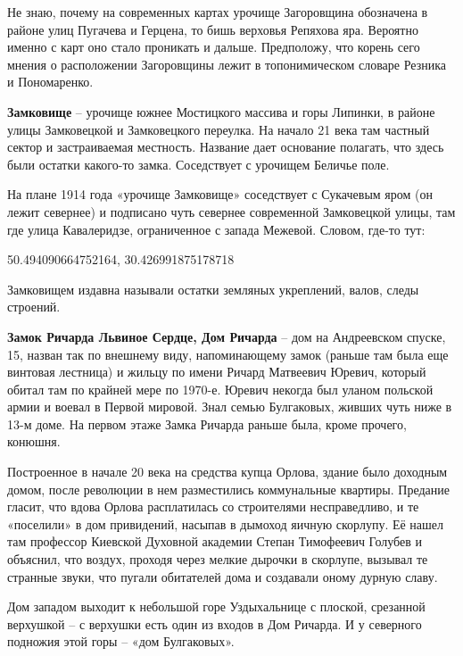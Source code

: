 Не знаю, почему на современных картах урочище Загоровщина обозначена в районе улиц Пугачева и Герцена, то бишь верховья Репяхова яра. Вероятно именно с карт оно стало проникать и дальше. Предположу, что корень сего мнения о расположении Загоровщины лежит в топонимическом словаре Резника и Пономаренко.\\

\medskip

\textbf{Замковище} – урочище южнее Мостицкого массива и горы Липинки, в районе улицы Замковецкой и Замковецкого переулка. На начало 21 века там частный сектор и застраиваемая местность. Название дает основание полагать, что здесь были остатки какого-то замка. Соседствует с урочищем Беличье поле.

На плане 1914 года «урочище Замковище» соседствует с Сукачевым яром (он лежит севернее) и подписано чуть севернее современной Замковецкой улицы, там где улица Кавалеридзе, ограниченное с запада Межевой. Словом, где-то тут:

50.494090664752164, 30.426991875178718

Замковищем издавна называли остатки земляных укреплений, валов, следы строений.\\ 

\medskip

\textbf{Замок Ричарда Львиное Сердце, Дом Ричарда} – дом на Андреевском спуске, 15, назван так по внешнему виду, напоминающему замок (раньше там была еще винтовая лестница) и жильцу по имени Ричард Матвеевич Юревич, который обитал там по крайней мере по 1970-е. Юревич некогда был уланом польской армии и воевал в Первой мировой. Знал семью Булгаковых, живших чуть ниже в 13-м доме. На первом этаже Замка Ричарда раньше была, кроме прочего, конюшня.

Построенное в начале 20 века на средства купца Орлова, здание было доходным домом, после революции в нем разместились коммунальные квартиры. Предание гласит, что вдова Орлова расплатилась со строителями несправедливо, и те «поселили» в дом привидений, насыпав в дымоход яичную скорлупу. Её нашел там профессор Киевской Духовной академии Степан Тимофеевич Голубев и объяснил, что воздух, проходя через мелкие дырочки в скорлупе, вызывал те странные
звуки, что пугали обитателей дома и создавали оному дурную славу.

Дом западом выходит к небольшой горе Уздыхальнице с плоской, срезанной верхушкой – с верхушки есть один из входов в Дом Ричарда. И у северного подножия этой горы – «дом Булгаковых».\\ 

